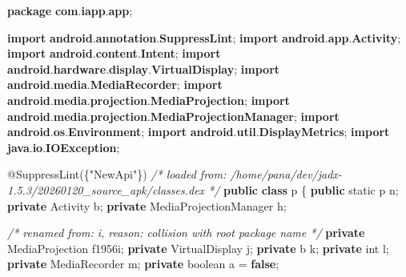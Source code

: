 \documentclass[
]{article}
\newenvironment{Shaded}{}{}
\newcommand{\AttributeTok}[1]{\textcolor[rgb]{0.49,0.56,0.16}{#1}}
\newcommand{\CommentTok}[1]{\textcolor[rgb]{0.38,0.63,0.69}{\textit{#1}}}
\newcommand{\DataTypeTok}[1]{\textcolor[rgb]{0.56,0.13,0.00}{#1}}
\newcommand{\ImportTok}[1]{\textcolor[rgb]{0.00,0.50,0.00}{\textbf{#1}}}
\newcommand{\KeywordTok}[1]{\textcolor[rgb]{0.00,0.44,0.13}{\textbf{#1}}}
\newcommand{\NormalTok}[1]{#1}
\newcommand{\OperatorTok}[1]{\textcolor[rgb]{0.40,0.40,0.40}{#1}}
\newcommand{\StringTok}[1]{\textcolor[rgb]{0.25,0.44,0.63}{#1}}
\begin{document}
\begin{Shaded}
\begin{Highlighting}[]
\KeywordTok{package}\ImportTok{ com}\OperatorTok{.}\ImportTok{iapp}\OperatorTok{.}\ImportTok{app}\OperatorTok{;}

\KeywordTok{import} \ImportTok{android}\OperatorTok{.}\ImportTok{annotation}\OperatorTok{.}\ImportTok{SuppressLint}\OperatorTok{;}
\KeywordTok{import} \ImportTok{android}\OperatorTok{.}\ImportTok{app}\OperatorTok{.}\ImportTok{Activity}\OperatorTok{;}
\KeywordTok{import} \ImportTok{android}\OperatorTok{.}\ImportTok{content}\OperatorTok{.}\ImportTok{Intent}\OperatorTok{;}
\KeywordTok{import} \ImportTok{android}\OperatorTok{.}\ImportTok{hardware}\OperatorTok{.}\ImportTok{display}\OperatorTok{.}\ImportTok{VirtualDisplay}\OperatorTok{;}
\KeywordTok{import} \ImportTok{android}\OperatorTok{.}\ImportTok{media}\OperatorTok{.}\ImportTok{MediaRecorder}\OperatorTok{;}
\KeywordTok{import} \ImportTok{android}\OperatorTok{.}\ImportTok{media}\OperatorTok{.}\ImportTok{projection}\OperatorTok{.}\ImportTok{MediaProjection}\OperatorTok{;}
\KeywordTok{import} \ImportTok{android}\OperatorTok{.}\ImportTok{media}\OperatorTok{.}\ImportTok{projection}\OperatorTok{.}\ImportTok{MediaProjectionManager}\OperatorTok{;}
\KeywordTok{import} \ImportTok{android}\OperatorTok{.}\ImportTok{os}\OperatorTok{.}\ImportTok{Environment}\OperatorTok{;}
\KeywordTok{import} \ImportTok{android}\OperatorTok{.}\ImportTok{util}\OperatorTok{.}\ImportTok{DisplayMetrics}\OperatorTok{;}
\KeywordTok{import} \ImportTok{java}\OperatorTok{.}\ImportTok{io}\OperatorTok{.}\ImportTok{IOException}\OperatorTok{;}

\AttributeTok{@SuppressLint}\OperatorTok{(\{}\StringTok{"NewApi"}\OperatorTok{\})}
\CommentTok{/* loaded from: /home/pana/dev/jadx{-}1.5.3/20260120\_source\_apk/classes.dex */}
\KeywordTok{public} \KeywordTok{class}\NormalTok{ p }\OperatorTok{\{}
    \KeywordTok{public} \DataTypeTok{static}\NormalTok{ p n}\OperatorTok{;}
    \KeywordTok{private}\NormalTok{ Activity b}\OperatorTok{;}
    \KeywordTok{private}\NormalTok{ MediaProjectionManager h}\OperatorTok{;}

    \CommentTok{/* renamed from: i, reason: collision with root package name */}
    \KeywordTok{private}\NormalTok{ MediaProjection f1956i}\OperatorTok{;}
    \KeywordTok{private}\NormalTok{ VirtualDisplay j}\OperatorTok{;}
    \KeywordTok{private}\NormalTok{ b k}\OperatorTok{;}
    \KeywordTok{private} \DataTypeTok{int}\NormalTok{ l}\OperatorTok{;}
    \KeywordTok{private}\NormalTok{ MediaRecorder m}\OperatorTok{;}
    \KeywordTok{private} \DataTypeTok{boolean}\NormalTok{ a }\OperatorTok{=} \KeywordTok{false}\OperatorTok{;}


\end{Highlighting}
\end{Shaded}
\end{document}

